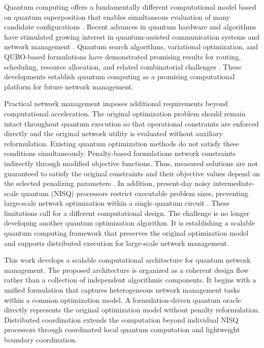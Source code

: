\documentclass[journal]{IEEEtran}
\begin{document}
{Quantum computing offers a fundamentally different computational model based on quantum superposition that enables simultaneous evaluation of many candidate configurations \cite{16,17}. Recent advances in quantum hardware and algorithms have stimulated growing interest in quantum-assisted communication systems and network management \cite{18,19}. Quantum search algorithms, variational optimization, and QUBO-based formulations have demonstrated promising results for routing, scheduling, resource allocation, and related combinatorial challenges \cite{17,20,21,22}. These developments establish quantum computing as a promising computational platform for future network management.

Practical network management imposes additional requirements beyond computational acceleration. The original optimization problem should remain intact throughout quantum execution so that operational constraints are enforced directly and the original network utility is evaluated without auxiliary reformulation. Existing quantum optimization methods do not satisfy these conditions simultaneously. Penalty-based formulations network constraints indirectly through modified objective functions. Thus, measured solutions are not guaranteed to satisfy the original constraints and their objective values depend on the selected penalizing parameters \cite{20,21}. In addition, present-day noisy intermediate-scale quantum (NISQ) processors restrict executable problem sizes, preventing large-scale network optimization within a single quantum circuit \cite{18,23}.
These limitations call for a different computational design. The challenge is no longer developing another quantum optimization algorithm. It is establishing a scalable quantum computing framework that preserves the original optimization model and supports distributed execution for large-scale network management.

This work develops a scalable computational architecture for quantum network management. The proposed architecture is organized as a coherent design flow rather than a collection of independent algorithmic components. It begins with a unified formulation that captures heterogeneous network management tasks within a common optimization model. A formulation-driven quantum oracle directly represents the original optimization model without penalty reformulation. Distributed coordination extends the computation beyond individual NISQ processors through coordinated local quantum computation and lightweight boundary coordination.

}
\end{document}
